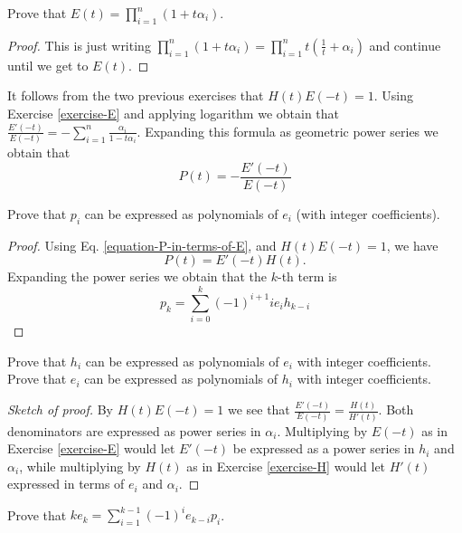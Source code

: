 \begin{exercise}
\label{exercise-E}
Prove that $E(t)=\prod_{i=1}^n(1+t\alpha_i)$.
\end{exercise}

\begin{proof}
This is just writing $\prod_{i=1}^n(1+t\alpha_i)
=\prod_{i=1}^nt(\frac{1}{t}+\alpha_i)$ and continue until we get to $E(t)$.
\end{proof}

It follows from the two previous exercises that $H(t)E(-t)=1$. Using Exercise
\ref{exercise-E} and applying logarithm we obtain that
$\frac{E'(-t)}{E(-t)}=-\sum_{i=1}^n \frac{\alpha_i}{1-t\alpha_i}$. Expanding
this formula as geometric power series we obtain that 
\begin{equation}
\label{equation-P-in-terms-of-E}
P(t)=-\frac{E'(-t)}{E(-t)}
\end{equation}

\begin{exercise}
\label{exercise-p-polynomials-of-e}
Prove that $p_i$ can be expressed as polynomials of $e_i$ (with integer
coefficients).
\end{exercise}

\begin{proof}
Using Eq. \ref{equation-P-in-terms-of-E}, and $H(t)E(-t)=1$, we have
$$
P(t)=E'(-t)H(t).
$$
Expanding the power series we obtain that the $k$-th term is
$$
p_k=\sum_{i=0}^k(-1)^{i+1}ie_ih_{k-i}
$$
\end{proof}

\begin{exercise}
\label{exercise-h-and-e}
Prove that $h_i$ can be expressed as polynomials of $e_i$ with integer
coefficients. Prove that $e_i$ can be expressed as polynomials of $h_i$ with
integer coefficients.
\end{exercise}

\begin{proof}[Sketch of proof]
By $H(t)E(-t)=1$ we see that $\frac{E'(-t)}{E(-t)}=\frac{H(t)}{H'(t)}$. Both
denominators are expressed as power series in $\alpha_i$. Multiplying by $E(-t)$
as in Exercise \ref{exercise-E} 
would let $E'(-t)$ be expressed as a power series in $h_i$ and
$\alpha_i$, while multiplying by $H(t)$ as in Exercise \ref{exercise-H} would 
let $H'(t)$ expressed in terms of
$e_i$ and $\alpha_i$.
\end{proof}

\begin{exercise}
\label{exercise-Newton-formula}
Prove that $ke_k=\sum_{i=1}^{k-1}(-1)^ie_{k-i}p_i$.
\end{exercise}

